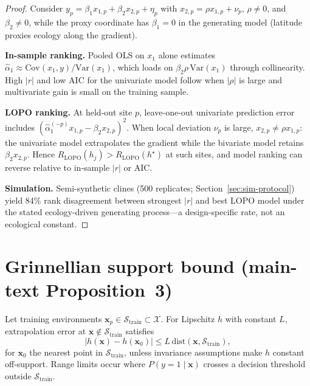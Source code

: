 \documentclass[11pt]{article}
\begin{document}
\begin{proof}
Consider $y_p=\beta_1 x_{1,p}+\beta_2 x_{2,p}+\eta_p$ with
$x_{2,p}=\rho x_{1,p}+\nu_p$, $\rho\neq 0$, and $\beta_2\neq 0$, while the
proxy coordinate has $\beta_1=0$ in the generating model (latitude proxies
ecology along the gradient).

\textbf{In-sample ranking.}  Pooled OLS on $x_1$ alone estimates
$\hat{\alpha}_1\approx \mathrm{Cov}(x_1,y)/\mathrm{Var}(x_1)$, which loads
on $\beta_2\rho\,\mathrm{Var}(x_1)$ through collinearity.  High $|r|$ and
low AIC for the univariate model follow when $|\rho|$ is large and
multivariate gain is small on the training sample.

\textbf{LOPO ranking.}  At held-out site $p$, leave-one-out univariate
prediction error includes
$(\hat{\alpha}_1^{(-p)} x_{1,p}-\beta_2 x_{2,p})^2$.  When local deviation
$\nu_p$ is large, $x_{2,p}\neq \rho x_{1,p}$: the univariate model
extrapolates the gradient while the bivariate model retains
$\beta_2 x_{2,p}$.  Hence $R_{\mathrm{LOPO}}(h_j)>R_{\mathrm{LOPO}}(h^\star)$
at such sites, and model ranking can reverse relative to in-sample $|r|$ or
AIC.

\textbf{Simulation.}  Semi-synthetic clines (500 replicates;
Section~\ref{sec:sim-protocol}) yield 84\% rank disagreement between
strongest $|r|$ and best LOPO model under the stated ecology-driven
generating process---a design-specific rate, not an ecological constant.
\end{proof}

\section{Grinnellian support bound (main-text Proposition~3)}
\label{sec:thm4}

\begin{theorem}
\label{thm:esm-support}
Let training environments $\mathbf{x}_p\in\mathcal{S}_{\mathrm{train}}
\subset\mathcal{X}$.  For Lipschitz $h$ with constant $L$,
extrapolation error at $\mathbf{x}\notin\mathcal{S}_{\mathrm{train}}$
satisfies
\[
  |h(\mathbf{x})-h(\mathbf{x}_0)|
  \le L\,\mathrm{dist}(\mathbf{x},\mathcal{S}_{\mathrm{train}}),
\]
for $\mathbf{x}_0$ the nearest point in $\mathcal{S}_{\mathrm{train}}$,
unless invariance assumptions make $h$ constant off-support.  Range
limits occur where $P(y=1\mid\mathbf{x})$ crosses a decision threshold
outside $\mathcal{S}_{\mathrm{train}}$.
\end{theorem}
\end{document}
